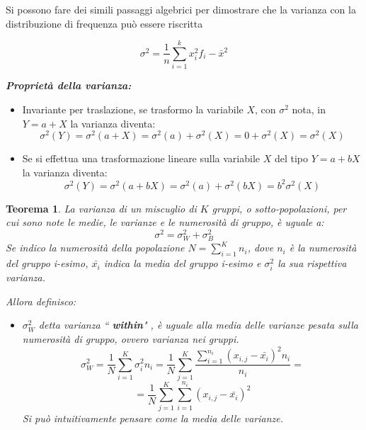 \documentclass{article}
\newtheorem{teorema}{Teorema}[section]
\begin{document}
\begin{itemize}
\begin{itemize}
               Si possono fare dei simili passaggi algebrici per dimostrare che la varianza con la distribuzione di frequenza può essere riscritta
               
               $$\sigma^2 =  \frac{1}{n}\sum_{i=1}^{k}x_i^2f_i-\bar{x}^2$$
               
                \textbf{\textit{Proprietà della varianza:}} 
                    \begin{itemize}
                       \item  Invariante per traslazione, se trasformo la variabile $X$, con $\sigma^2$ nota, in  $Y=a+X$ la varianza diventa: $$\sigma^2(Y)= \sigma^2(a+X)=\sigma^2(a)+\sigma^2(X)=0+\sigma^2(X)=\sigma^2(X)$$
                       
                       \item Se si effettua una trasformazione lineare sulla variabile $X$ del tipo $Y=a+bX$ la varianza diventa: $$\sigma^2(Y)= \sigma^2(a+bX)=\sigma^2(a)+\sigma^2(bX)=b^2\sigma^2(X)$$

                    \end{itemize} %
                    
              
                    \begin{teorema}
                        La varianza di un miscuglio di $K$ gruppi, o sotto-popolazioni, per cui sono note le medie, le varianze e le numerosità di gruppo, è uguale a: 
                        $$\sigma^2 = \sigma^2_W + \sigma^2_B$$
                        Se indico la numerosità della popolazione $N=\sum_{i=1}^{K} n_i$, dove $n_i$ è la numerosità del gruppo i-esimo, $\bar{x_i}$ indica la media del gruppo i-esimo e $\sigma^2_i$ la sua rispettiva varianza. 
                        
                        \newpage 
                        
                        Allora definisco: 
                        \begin{itemize}
                            \item $\sigma^2_W$ detta varianza ``\textbf { within}" , è uguale alla media delle varianze pesata sulla numerosità di gruppo, ovvero varianza nei gruppi. 
                            $$ \sigma^2_W = \frac{1}{N}\sum_{i=1}^{K}\sigma^2_in_i= 
                            \frac{1}{N}\sum_{j=1}^{K}\frac{\sum_{i=1}^{n_i}(x_{i,j}- \bar{x_i})^2 n_i}{n_i}=$$
                            $$= \frac{1}{N}\sum_{j=1}^{K}\sum_{i=1}^{n_i}(x_{i,j}- \bar{x_i})^2$$
                            Si può intuitivamente pensare come la media delle varianze. 
                          

\end{itemize}
\end{teorema}
\end{itemize}
\end{itemize}
\end{document}
